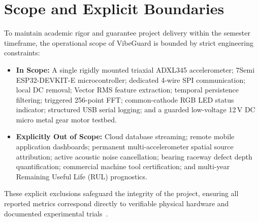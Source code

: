 \section{Scope and Explicit Boundaries}
To maintain academic rigor and guarantee project delivery within the semester timeframe, the operational scope of VibeGuard is bounded by strict engineering constraints:
\begin{itemize}
    \item \textbf{In Scope:} A single rigidly mounted triaxial ADXL345 accelerometer; 7Semi ESP32-DEVKIT-E microcontroller; dedicated 4-wire SPI communication; local DC removal; Vector RMS feature extraction; temporal persistence filtering; triggered 256-point FFT; common-cathode RGB LED status indicator; structured USB serial logging; and a guarded low-voltage 12\,V DC micro metal gear motor testbed.
    \item \textbf{Explicitly Out of Scope:} Cloud database streaming; remote mobile application dashboards; permanent multi-accelerometer spatial source attribution; active acoustic noise cancellation; bearing raceway defect depth quantification; commercial machine tool certification; and multi-year Remaining Useful Life (RUL) prognostics.
\end{itemize}
These explicit exclusions safeguard the integrity of the project, ensuring all reported metrics correspond directly to verifiable physical hardware and documented experimental trials~\cite{vibeguard_primer2026}.

